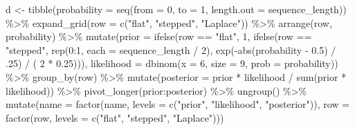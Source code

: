 \documentclass[
  letterpaper,
  DIV=11,
  numbers=noendperiod]{scrreprt}
\newenvironment{Shaded}{\begin{snugshade}}{\end{snugshade}}
\newcommand{\AttributeTok}[1]{\textcolor[rgb]{0.40,0.45,0.13}{#1}}
\newcommand{\DecValTok}[1]{\textcolor[rgb]{0.68,0.00,0.00}{#1}}
\newcommand{\FloatTok}[1]{\textcolor[rgb]{0.68,0.00,0.00}{#1}}
\newcommand{\FunctionTok}[1]{\textcolor[rgb]{0.28,0.35,0.67}{#1}}
\newcommand{\InformationTok}[1]{\textcolor[rgb]{0.37,0.37,0.37}{#1}}
\newcommand{\NormalTok}[1]{\textcolor[rgb]{0.00,0.23,0.31}{#1}}
\newcommand{\OtherTok}[1]{\textcolor[rgb]{0.00,0.23,0.31}{#1}}
\newcommand{\SpecialCharTok}[1]{\textcolor[rgb]{0.37,0.37,0.37}{#1}}
\newcommand{\StringTok}[1]{\textcolor[rgb]{0.13,0.47,0.30}{#1}}
\begin{document}
\begin{codelisting}
\begin{Shaded}
\begin{Highlighting}[]
\NormalTok{d }\OtherTok{\textless{}{-}}
  \FunctionTok{tibble}\NormalTok{(}\AttributeTok{probability =} \FunctionTok{seq}\NormalTok{(}\AttributeTok{from =} \DecValTok{0}\NormalTok{, }\AttributeTok{to =} \DecValTok{1}\NormalTok{, }\AttributeTok{length.out =}\NormalTok{ sequence\_length)) }\SpecialCharTok{\%\textgreater{}\%} 
  \FunctionTok{expand\_grid}\NormalTok{(}\AttributeTok{row =} \FunctionTok{c}\NormalTok{(}\StringTok{"flat"}\NormalTok{, }\StringTok{"stepped"}\NormalTok{, }\StringTok{"Laplace"}\NormalTok{))  }\SpecialCharTok{\%\textgreater{}\%} 
  \FunctionTok{arrange}\NormalTok{(row, probability) }\SpecialCharTok{\%\textgreater{}\%} 
  \FunctionTok{mutate}\NormalTok{(}\AttributeTok{prior =} \FunctionTok{ifelse}\NormalTok{(row }\SpecialCharTok{==} \StringTok{"flat"}\NormalTok{, }\DecValTok{1}\NormalTok{,}
                        \FunctionTok{ifelse}\NormalTok{(row }\SpecialCharTok{==} \StringTok{"stepped"}\NormalTok{, }\FunctionTok{rep}\NormalTok{(}\DecValTok{0}\SpecialCharTok{:}\DecValTok{1}\NormalTok{, }\AttributeTok{each =}\NormalTok{ sequence\_length }\SpecialCharTok{/} \DecValTok{2}\NormalTok{),}
                               \FunctionTok{exp}\NormalTok{(}\SpecialCharTok{{-}}\FunctionTok{abs}\NormalTok{(probability }\SpecialCharTok{{-}} \FloatTok{0.5}\NormalTok{) }\SpecialCharTok{/}\NormalTok{ .}\DecValTok{25}\NormalTok{) }\SpecialCharTok{/}\NormalTok{ ( }\DecValTok{2} \SpecialCharTok{*} \FloatTok{0.25}\NormalTok{))),}
         \AttributeTok{likelihood =} \FunctionTok{dbinom}\NormalTok{(}\AttributeTok{x =} \DecValTok{6}\NormalTok{, }\AttributeTok{size =} \DecValTok{9}\NormalTok{, }\AttributeTok{prob =}\NormalTok{ probability)) }\SpecialCharTok{\%\textgreater{}\%} 
  \FunctionTok{group\_by}\NormalTok{(row) }\SpecialCharTok{\%\textgreater{}\%} 
  \FunctionTok{mutate}\NormalTok{(}\AttributeTok{posterior =}\NormalTok{ prior }\SpecialCharTok{*}\NormalTok{ likelihood }\SpecialCharTok{/} \FunctionTok{sum}\NormalTok{(prior }\SpecialCharTok{*}\NormalTok{ likelihood)) }\SpecialCharTok{\%\textgreater{}\%} 
  \FunctionTok{pivot\_longer}\NormalTok{(prior}\SpecialCharTok{:}\NormalTok{posterior)  }\SpecialCharTok{\%\textgreater{}\%} 
  \FunctionTok{ungroup}\NormalTok{() }\SpecialCharTok{\%\textgreater{}\%} 
  \FunctionTok{mutate}\NormalTok{(}\AttributeTok{name =} \FunctionTok{factor}\NormalTok{(name, }\AttributeTok{levels =} \FunctionTok{c}\NormalTok{(}\StringTok{"prior"}\NormalTok{, }\StringTok{"likelihood"}\NormalTok{, }\StringTok{"posterior"}\NormalTok{)),}
         \AttributeTok{row  =} \FunctionTok{factor}\NormalTok{(row, }\AttributeTok{levels =} \FunctionTok{c}\NormalTok{(}\StringTok{"flat"}\NormalTok{, }\StringTok{"stepped"}\NormalTok{, }\StringTok{"Laplace"}\NormalTok{)))}
\InformationTok{\textasciigrave{}\textasciigrave{}\textasciigrave{}}
\end{Highlighting}
\end{Shaded}

\end{codelisting}
\end{document}

